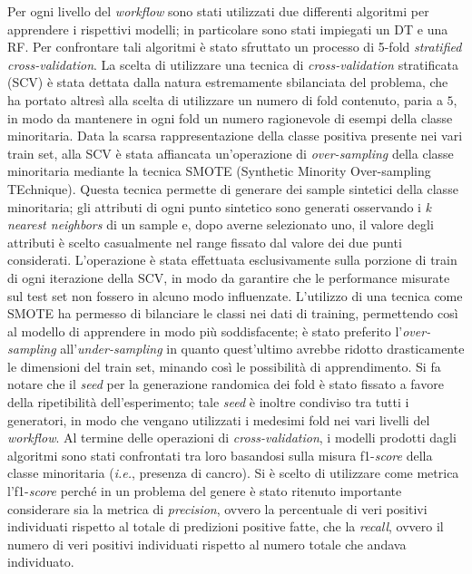 Per ogni livello del \textit{workflow} sono stati utilizzati due differenti algoritmi per apprendere i rispettivi modelli; in particolare sono stati impiegati un DT e una RF.
Per confrontare tali algoritmi  è stato sfruttato un processo di 5-fold \textit{stratified cross-validation}.
La scelta di utilizzare una tecnica di \textit{cross-validation} stratificata (SCV) è stata dettata dalla natura estremamente sbilanciata del problema, che ha portato altresì alla scelta di utilizzare un numero di fold contenuto, paria a $5$, in modo da mantenere in ogni fold un numero ragionevole di esempi della classe minoritaria.
Data la scarsa rappresentazione della classe positiva presente nei vari train set, alla SCV è stata affiancata un'operazione di \textit{over-sampling} della classe minoritaria mediante la tecnica SMOTE (Synthetic Minority Over-sampling TEchnique). 
Questa tecnica permette di generare dei sample sintetici della classe minoritaria; gli attributi di ogni punto sintetico sono generati osservando i \textit{k nearest neighbors} di un sample e, dopo averne selezionato uno, il valore degli attributi è scelto casualmente nel range fissato dal valore dei due punti considerati.
L'operazione è stata effettuata esclusivamente sulla porzione di train di ogni iterazione della SCV, in modo da garantire che le performance misurate sul test set non fossero in alcuno modo influenzate.
L'utilizzo di una tecnica come SMOTE ha permesso di bilanciare le classi nei dati di training, permettendo così al modello di apprendere in modo più soddisfacente; è stato preferito l'\textit{over-sampling} all'\textit{under-sampling} in quanto quest'ultimo avrebbe ridotto drasticamente le dimensioni del train set, minando così le possibilità di apprendimento.
Si fa notare che il \textit{seed} per la generazione randomica dei fold è stato fissato a favore della ripetibilità dell'esperimento; tale \textit{seed} è inoltre condiviso tra tutti i generatori, in modo che vengano utilizzati i medesimi fold nei vari livelli del \textit{workflow}.
Al termine delle operazioni di \textit{cross-validation}, i modelli prodotti dagli algoritmi sono stati confrontati tra loro basandosi sulla misura f1-\textit{score} della classe minoritaria (\textit{i.e.}, presenza di cancro).
Si è scelto di utilizzare come metrica l'f1-\textit{score} perché in un problema del genere è stato ritenuto importante considerare sia la metrica di \textit{precision}, ovvero la percentuale di veri positivi individuati rispetto al totale di predizioni positive fatte, che la \textit{recall}, ovvero il numero di veri positivi individuati rispetto al numero totale che andava individuato. 
